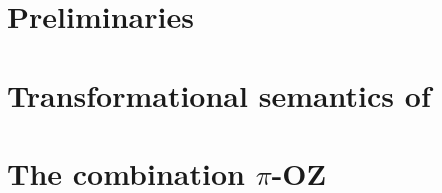 \chapter{Preliminaries}
\label{chp_preliminaries}


\chapter{Transformational semantics of \oz{}}
\label{chp_tra_sem_oz}


\chapter{The combination $\pi$-OZ}
\label{chp_tra_sem_oz}
